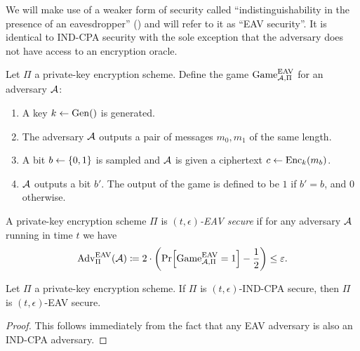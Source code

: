 We will make use of a weaker form of security called ``indistinguishability in the presence of an eavesdropper'' (\cite{introduction-to-modern-cryptography}) and will refer to it as ``EAV security''. It is identical to IND-CPA security with the sole exception that the adversary does not have access to an encryption oracle.

\begin{definition}
	Let $\Pi$ a private-key encryption scheme. Define the game $\mathrm{Game}_{\mathcal{A}, \Pi}^{\mathrm{EAV}}$ for an adversary $\mathcal{A}$:
	\begin{enumerate}[1.]
		\item A key $k \leftarrow \mathrm{Gen}()$ is generated.
		\item The adversary $\mathcal{A}$ outputs a pair of messages $m_0, m_1$ of the same length.
		\item A bit $b \leftarrow \{0, 1\}$ is sampled and $\mathcal{A}$ is given a ciphertext $c \leftarrow \mathrm{Enc}_k(m_b)$.
		\item $\mathcal{A}$ outputs a bit $b'$. The output of the game is defined to be $1$ if $b' = b$, and $0$ otherwise.
	\end{enumerate}
\end{definition}

\begin{definition}
	A private-key encryption scheme $\Pi$ is \emph{$(t, \epsilon)$-EAV secure} if for any adversary $\mathcal{A}$ running in time $t$ we have
	\begin{align*}
		\mathrm{Adv}_{\Pi}^{\mathrm{EAV}}(\adv) \coloneqq 2 \cdot \left(\pr{\mathrm{Game}_{\adv, \Pi}^{\mathrm{EAV}} = 1} - \frac{1}{2}\right) \le \epsilon.
	\end{align*}
\end{definition}


\begin{lemma}
	Let $\Pi$ a private-key encryption scheme. If $\Pi$ is $(t, \epsilon)$-IND-CPA secure, then $\Pi$ is $(t, \epsilon)$-EAV secure.
\end{lemma}
\begin{proof}
	This follows immediately from the fact that any EAV adversary is also an IND-CPA adversary.
\end{proof}

